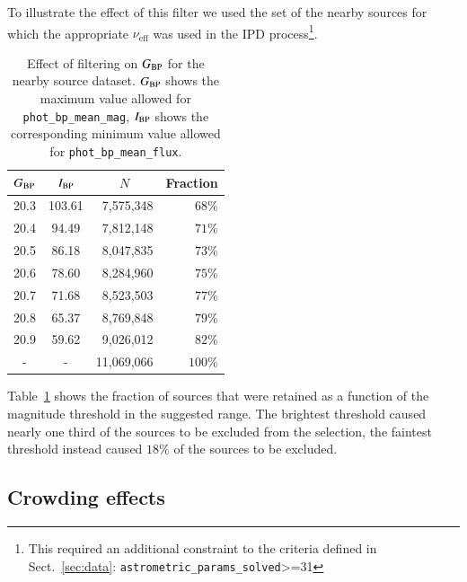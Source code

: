 \documentclass{aa}
\newcommand{\gbp}{\ensuremath{G_{\rm BP}}\xspace}
\newcommand{\nueff}{\ensuremath{\nu_\text{eff}}\xspace}
\newcommand{\secname}{Sect.}
\newcommand{\secref}[1]{\secname~\ref{sec:#1}}
\newcommand{\tabref}[1]{Table~\ref{tab:#1}}
\begin{document}
To illustrate the effect of this filter we used the set of the nearby sources for which the appropriate \nueff was used in the IPD process\footnote{This required an additional constraint to the criteria defined in \secref{data}: \texttt{astrometric\_params\_solved}>=31}.
%
\begin{table}[]
    \caption{Effect of filtering on \gbp for the nearby source dataset. \gbp shows the maximum value allowed for \texttt{phot\_bp\_mean\_mag}, $I_{\rm BP}$ shows the corresponding minimum value allowed for \texttt{phot\_bp\_mean\_flux}.} 
    \label{tab:nearby_sel_frac}
    \centering
    \begin{tabular}{c|c|r|r}
    \hline\hline
    \gbp & $I_{\rm BP}$ & \multicolumn{1}{c|}{$N$} & \multicolumn{1}{c}{Fraction}\\
    \hline
    20.3 & 103.61 &  7,575,348 &  $68\%$\\ 
    20.4 &  94.49 &  7,812,148 &  $71\%$\\
    20.5 &  86.18 &  8,047,835 &  $73\%$\\
    20.6 &  78.60 &  8,284,960 &  $75\%$\\
    20.7 &  71.68 &  8,523,503 &  $77\%$\\
    20.8 &  65.37 &  8,769,848 &  $79\%$\\
    20.9 &  59.62 &  9,026,012 &  $82\%$\\
    - &   - & 11,069,066 & $100\%$\\
    \hline
    \end{tabular}
\end{table}
%
\tabref{nearby_sel_frac} shows the fraction of sources that were retained as a function of the magnitude threshold in the suggested range. The brightest threshold caused nearly one third of the sources to be excluded from the selection, the faintest threshold instead caused $18\%$ of the sources to be excluded.

\subsection{Crowding effects}\label{sec:quality:crowding}
\end{document}
